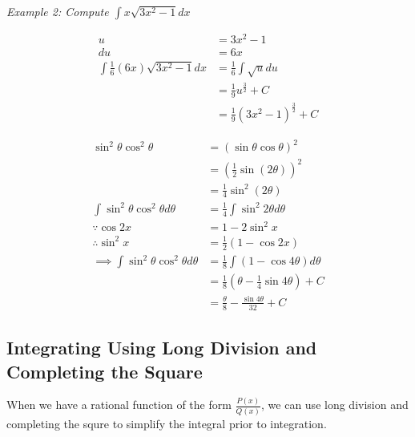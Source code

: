         \noindent \color{blue} \textit{Example 2: Compute $\int x\sqrt{3x^2-1}dx$} \color{black}

        \begin{align*}
            u                                   &= 3x^2-1 \\
            du                                  &= 6x \\
            \int \frac{1}{6}(6x)\sqrt{3x^2-1}dx &= \frac{1}{6}\int\sqrt{u}du \\
            &= \frac{1}{9}u^{\frac{3}{2}}+C \\
            &= \frac{1}{9}(3x^2-1)^{\frac{3}{2}} + C
        \end{align*}

        \noindent \color{blue}  \color{black}

        \begin{align*}
            \sin^2{\theta}\cos^2{\theta}                     &= (\sin{\theta}\cos{\theta})^2 \\
            &= \left(\frac{1}{2}\sin{(2\theta)}\right)^2 \\
            &= \frac{1}{4}\sin^2{(2\theta)} \\
            \int\sin^2{\theta}\cos^2{\theta}d\theta          &= \frac{1}{4}\int\sin^2{2\theta}d\theta \\
            \because \cos{2x}                                &= 1-2\sin^2{x} \\
            \therefore \sin^2{x}                             &=\frac{1}{2}(1-\cos{2x}) \\
            \implies \int\sin^2{\theta}\cos^2{\theta}d\theta &= \frac{1}{8}\int(1-\cos{4\theta})d\theta \\
            &= \frac{1}{8}\left(\theta-\frac{1}{4}\sin{4\theta}\right)+C \\
            &= \frac{\theta}{8}-\frac{\sin{4\theta}}{32}+C
        \end{align*}



    \pagebreak
    \subsection{Integrating Using Long Division and Completing the Square}
        When we have a rational function of the form $\frac{P(x)}{Q(x)}$, we can use long
        division and completing the squre to simplify the integral prior to integration. \\

